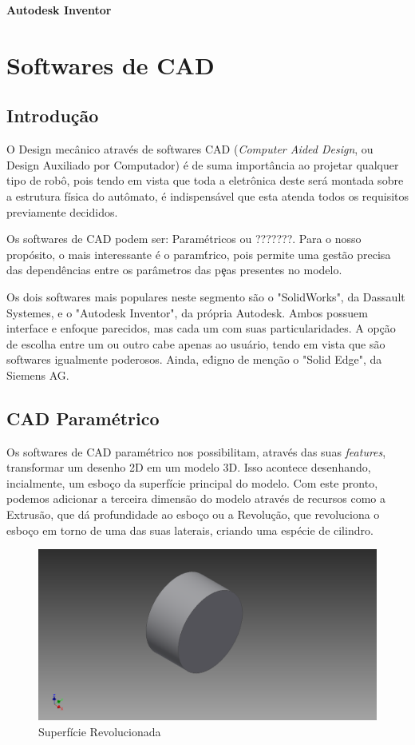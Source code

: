 
\begin{center}
\textbf{Autodesk Inventor}
\end{center}
	\section{Softwares de CAD}
\subsection{Introdução}

	O Design mec\^anico atrav\'es de softwares CAD ({\it Computer Aided Design}, ou Design Auxiliado por Computador) \'e de suma import\^ancia ao projetar qualquer tipo de rob\^o, pois tendo em vista que toda a eletr\^onica deste ser\'a montada sobre a estrutura f\'isica do aut\^omato, \'e indispens\'avel que esta atenda todos os requisitos previamente decididos.
	
	Os softwares de CAD podem ser: Param\'etricos ou ???????. Para o nosso prop\'osito, o mais interessante \'e o param\'trico, pois permite uma gest\~ao precisa das depend\^encias entre os par\^ametros das pe\c{}as presentes no modelo.
	
	Os dois softwares mais populares neste segmento s\~ao o "SolidWorks", da Dassault Systemes, e o "Autodesk Inventor", da pr\'opria Autodesk. Ambos possuem interface e enfoque parecidos, mas cada um com suas particularidades. A opç\~ao de escolha entre um ou outro cabe apenas ao usu\'ario, tendo em vista que s\~ao softwares igualmente poderosos.
	Ainda, e\' digno de men\c{c}\~ao o "Solid Edge", da Siemens AG.
	\\
	\subsection{CAD Param\'etrico}
	
	Os softwares de CAD  param\'etrico nos possibilitam, atrav\'es das suas {\it features}, transformar um desenho 2D em um modelo 3D. Isso acontece desenhando, incialmente, um esbo\c{c}o da superf\'icie principal do modelo. Com este pronto, podemos adicionar a terceira dimens\~ao do modelo atrav\'es de recursos como a Extrus\~ao, que d\'a profundidade ao esboço ou a Revolu\c{c}\~ao, que revoluciona o esbo\c{c}o em torno de uma das suas laterais, criando uma esp\'ecie de cilindro.


	\begin{figure}[h]
	\includegraphics[scale=0.3]{./include/chapters/sections/mec/section1/imgs/box.png}
	\caption{Superf\'icie Revolucionada}
	\label{Rev}
	\end{figure}

